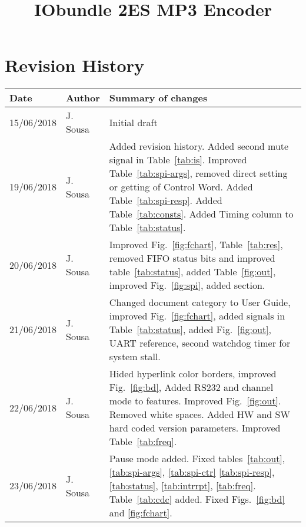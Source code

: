 \documentclass{ug}
\title{IObundle 2ES MP3 Encoder}
\theoremstyle{plain}
\begin{document}
\maketitle
\cleardoublepage
\tableofcontents
\cleardoublepage
\listoftables
\cleardoublepage
\listoffigures
\cleardoublepage

\section*{Revision History}

\begin{table}[H]
  \begin{center}
    \begin{tabular}{|l|l|p{8cm}|}
      \hline
      \rowcolor{iob-green}
      \textbf{Date} & \textbf{Author} & \textbf{Summary of changes} \\
      \hline
      \hline

      15/06/2018 & J. Sousa & Initial draft \\
      \hline

      \rowcolor{iob-blue} 19/06/2018 & J. Sousa & Added revision history. Added
      second mute signal in Table~\ref{tab:is}. Improved
      Table~\ref{tab:spi-args}, removed direct setting or getting of Control
      Word. Added Table~\ref{tab:spi-resp}. Added Table~\ref{tab:consts}.  Added
      Timing column to Table~\ref{tab:status}.\\ \hline

      20/06/2018 & J. Sousa & Improved Fig.~\ref{fig:fchart},
      Table~\ref{tab:res}, removed FIFO status bits and improved
      table~\ref{tab:status}, added Table~\ref{fig:out}, improved
      Fig.~\ref{fig:spi}, added section.\\ \hline

      \rowcolor{iob-blue} 21/06/2018 & J. Sousa & Changed document category to
      User Guide, improved Fig.~\ref{fig:fchart}, added signals in
      Table~\ref{tab:status}, added Fig.~\ref{fig:out}, UART reference, second
      watchdog timer for system stall.\\ \hline

      22/06/2018 & J. Sousa & Hided hyperlink color borders, improved
      Fig.~\ref{fig:bd}, Added RS232 and channel mode to features. Improved
      Fig.~\ref{fig:out}. Removed white spaces. Added HW and SW hard coded
      version parameters. Improved Table~\ref{tab:freq}.\\ \hline

      \rowcolor{iob-blue} 23/06/2018 & J. Sousa & Pause mode added. Fixed
      tables~\ref{tab:out}, \ref{tab:spi-args}, \ref{tab:spi-ctr}
      \ref{tab:spi-resp}, \ref{tab:status}, \ref{tab:intrrpt}, \ref{tab:freq}.
      Table~\ref{tab:cdc} added. Fixed Figs.~\ref{fig:bd} and
      \ref{fig:fchart}.\\ \hline


\end{tabular}
\end{center}
\end{table}
\end{document}
